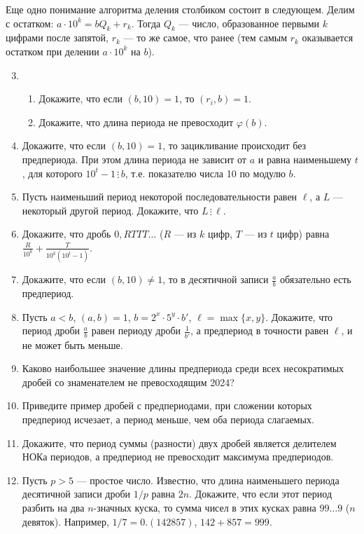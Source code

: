 \documentclass{article}
\begin{document}
{Еще одно понимание алгоритма деления столбиком}  состоит в следующем.
Делим с остатком: $a\cdot 10^k=bQ_k+r_k$.
Тогда $Q_k$ --- число, образованное первыми $k$ цифрами после запятой,
$r_k$ --- то же самое, что ранее (тем самым $r_k$ оказывается остатком при делении $a\cdot 10^k$ на $b$).
\begin{enumerate}[label*=\protect\fbox{\arabic{enumi}}]
	\setcounter{enumi}{2}
\item 
\begin{enumerate}
	\item Докажите, что если $(b,10)=1$, то $(r_i,b)=1$.
	\item Докажите, что длина периода не превосходит $\varphi(b)$.
\end{enumerate}

\item Докажите, что если $(b,10)=1$, то зацикливание происходит без предпериода. При этом длина периода не зависит от $a$
и равна наименьшему $t$, для которого $10^t-1 \,\vdots\, b$, т.е. показателю числа 10 по модулю $b$.

\item Пусть наименьший период некоторой последовательности равен $\ell$, а $L$ --- некоторый другой период. Докажите, что $L \,\vdots\, \ell$.

\item Докажите, что дробь $0,RTTT\dots$ ($R$ --- из $k$ цифр, $T$ --- из $t$ цифр)
равна $\frac{R}{10^k}+\frac{T}{10^k(10^t-1)}$.

\item Докажите, что если $(b,10)\neq 1$, то в десятичной записи $\frac{a}{b}$ обязательно есть предпериод.

\item Пусть $a<b$, $(a,b)=1$, $b=2^x\cdot 5^y\cdot b'$, $\ell=\max\{x,y\}$. Докажите, что период дроби
$\frac{a}{b}$ равен периоду дроби $\frac{1}{b'}$,  а предпериод
в точности равен $\ell$, и не может быть меньше.

\item Каково наибольшее значение длины предпериода среди всех несократимых дробей со знаменателем 
не превосходящим 2024?

\item Приведите пример дробей с предпериодами, при сложении которых предпериод исчезает, а период
меньше, чем оба периода слагаемых.

\item Докажите, что период суммы (разности) двух дробей является делителем НОКа периодов, 
а предпериод не превосходит максимума предпериодов.

\item Пусть $p>5$ --- простое число. Известно, что длина наименьшего периода десятичной записи дроби $1/p$ равна $2n$. 
Докажите, что если этот период разбить на два $n$-значных куска,
то сумма чисел в этих кусках равна $99\dots 9$ ($n$ девяток).  
Например, $1/7=0.(142857)$, $142+857=999$.

\end{enumerate}
\end{document}

